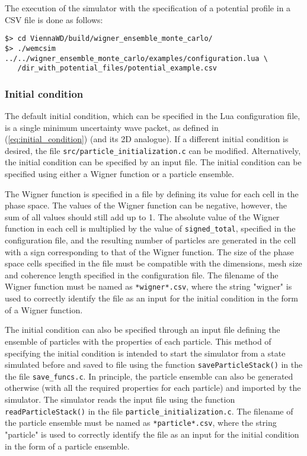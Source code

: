 The execution of the simulator with the specification of a potential profile in a CSV file is done as follows:
\begin{lstlisting}
$> cd ViennaWD/build/wigner_ensemble_monte_carlo/
$> ./wemcsim ../../wigner_ensemble_monte_carlo/examples/configuration.lua \
   /dir_with_potential_files/potential_example.csv
\end{lstlisting}


\subsubsection{Initial condition}

The default initial condition, which can be specified in the Lua configuration file, is a single minimum uncertainty wave packet, as defined in (\ref{eq:initial_condition}) (and its 2D analogue). 
If a different initial condition is desired, the file \texttt{src/particle\_initialization.c} can be modified. Alternatively, the initial condition can be specified by an input file. The initial condition can be specified using either a Wigner function or a particle ensemble. 

The Wigner function is specified in a file by defining its value for each cell in the phase space. The values of the Wigner function can be negative, however, the sum of all values should still add up to 1. The absolute value of the Wigner function in each cell is multiplied by the value of \texttt{signed\_total}, specified in the configuration file, and the resulting number of particles are generated in the cell with a sign corresponding to that of the Wigner function. The size of the phase space cells specified in the file must be compatible with the dimensions, mesh size and coherence length specified in the configuration file. The filename of the Wigner function must be named as \texttt{*wigner*.csv}, where the string "wigner" is used to correctly identify the file as an input for the initial condition in the form of a Wigner function. 

The initial condition can also be specified through an input file defining the ensemble of particles with the properties of each particle. This method of specifying the initial condition is intended to start the simulator from a state simulated before and saved to file using the function \texttt{saveParticleStack()} in the the file \texttt{save\_funcs.c}. In principle, the particle ensemble can also be generated otherwise (with all the required properties for each particle) and imported by the simulator. The simulator reads the input file using the function \texttt{readParticleStack()} in the file \texttt{particle\_initialization.c}. The filename of the particle ensemble must be named as \texttt{*particle*.csv}, where the string "particle" is used to correctly identify the file as an input for the initial condition in the form of a particle ensemble.

